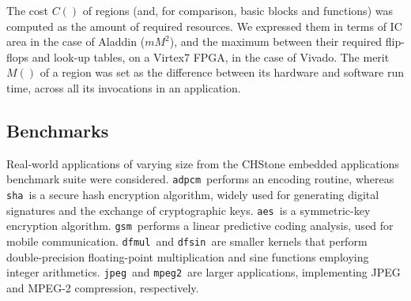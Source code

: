 \documentclass[]{usiinfthesis}
\newcommand{\adpcm}{\texttt{adpcm}}
\newcommand{\sha}{\texttt{sha}}
\newcommand{\jpeg}{\texttt{jpeg}}
\newcommand{\mpeg}{\texttt{mpeg2}}
\newcommand{\aes}{\texttt{aes}}
\newcommand{\dfmul}{\texttt{dfmul}}
\newcommand{\dfsin}{\texttt{dfsin}}
\newcommand{\gsm}{\texttt{gsm}}
\begin{document}
The cost $C()$ of regions (and, for comparison, basic
blocks and functions) was computed as the amount of required resources. We
expressed them in terms of IC area in the case of Aladdin ($mM^2$), and the
maximum between their required flip-flops and look-up tables,
on a Virtex7 FPGA, in the case of Vivado. The merit $M()$ of a
region was set as the difference between its hardware and software run
time, across all its invocations in an application.

\subsection{Benchmarks}
\label{subsec:benchmarks}
\vspace{.3cm}


Real-world applications of varying size from the CHStone
embedded applications benchmark suite \cite{HaraMay08} were considered. 
\adpcm\ performs an encoding routine, whereas \sha\ is a secure hash
encryption algorithm, widely used for generating digital signatures
and the exchange of cryptographic keys. \aes\ is a symmetric-key
encryption algorithm. \gsm\ performs a linear predictive coding
analysis, used for mobile communication.  \dfmul\ and \dfsin\ are
smaller kernels that perform double-precision floating-point
multiplication and sine functions employing integer arithmetics.
\jpeg\ and \mpeg\ are larger applications, implementing JPEG and
MPEG-2 compression, respectively.  
\end{document}
